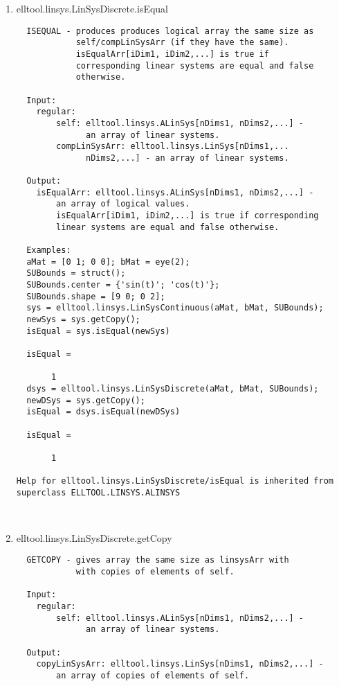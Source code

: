 \begin{enumerate}
\begin{lstlisting}
\end{lstlisting}
\fontfamily{\familydefault}
\selectfont
\item {elltool.linsys.LinSysDiscrete.isEqual}
\selectfont
\begin{lstlisting}
  ISEQUAL - produces produces logical array the same size as
            self/compLinSysArr (if they have the same).
            isEqualArr[iDim1, iDim2,...] is true if
            corresponding linear systems are equal and false
            otherwise.

  Input:
    regular:
        self: elltool.linsys.ALinSys[nDims1, nDims2,...] -
              an array of linear systems.
        compLinSysArr: elltool.linsys.LinSys[nDims1,...
              nDims2,...] - an array of linear systems.

  Output:
    isEqualArr: elltool.linsys.ALinSys[nDims1, nDims2,...] -
        an array of logical values.
        isEqualArr[iDim1, iDim2,...] is true if corresponding
        linear systems are equal and false otherwise.

  Examples:
  aMat = [0 1; 0 0]; bMat = eye(2);
  SUBounds = struct();
  SUBounds.center = {'sin(t)'; 'cos(t)'};
  SUBounds.shape = [9 0; 0 2];
  sys = elltool.linsys.LinSysContinuous(aMat, bMat, SUBounds);
  newSys = sys.getCopy();
  isEqual = sys.isEqual(newSys)

  isEqual =

       1
  dsys = elltool.linsys.LinSysDiscrete(aMat, bMat, SUBounds);
  newDSys = sys.getCopy();
  isEqual = dsys.isEqual(newDSys)

  isEqual =

       1

Help for elltool.linsys.LinSysDiscrete/isEqual is inherited from superclass ELLTOOL.LINSYS.ALINSYS



\end{lstlisting}
\fontfamily{\familydefault}
\selectfont
\item {elltool.linsys.LinSysDiscrete.getCopy}
\selectfont
\begin{lstlisting}
  GETCOPY - gives array the same size as linsysArr with
            with copies of elements of self.

  Input:
    regular:
        self: elltool.linsys.ALinSys[nDims1, nDims2,...] -
              an array of linear systems.

  Output:
    copyLinSysArr: elltool.linsys.LinSys[nDims1, nDims2,...] -
        an array of copies of elements of self.


\end{lstlisting}
\end{enumerate}
